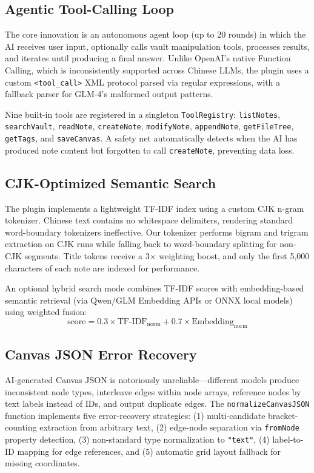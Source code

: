 \documentclass[10pt,a4paper]{article}
\begin{document}
\subsection{Agentic Tool-Calling Loop}

The core innovation is an autonomous agent loop (up to 20 rounds) in which the AI receives user input, optionally calls vault manipulation tools, processes results, and iterates until producing a final answer. Unlike OpenAI's native Function Calling, which is inconsistently supported across Chinese LLMs, the plugin uses a custom \texttt{<tool\_call>} XML protocol parsed via regular expressions, with a fallback parser for GLM-4's malformed output patterns.

Nine built-in tools are registered in a singleton \texttt{ToolRegistry}: \texttt{listNotes}, \texttt{searchVault}, \texttt{readNote}, \texttt{createNote}, \texttt{modifyNote}, \texttt{appendNote}, \texttt{getFileTree}, \texttt{getTags}, and \texttt{saveCanvas}. A safety net automatically detects when the AI has produced note content but forgotten to call \texttt{createNote}, preventing data loss.

\subsection{CJK-Optimized Semantic Search}

The plugin implements a lightweight TF-IDF index using a custom CJK n-gram tokenizer. Chinese text contains no whitespace delimiters, rendering standard word-boundary tokenizers ineffective. Our tokenizer performs bigram and trigram extraction on CJK runs while falling back to word-boundary splitting for non-CJK segments. Title tokens receive a 3$\times$ weighting boost, and only the first 5,000 characters of each note are indexed for performance.

An optional hybrid search mode combines TF-IDF scores with embedding-based semantic retrieval (via Qwen/GLM Embedding APIs or ONNX local models) using weighted fusion:
\begin{equation}
\text{score} = 0.3 \times \text{TF-IDF}_{\text{norm}} + 0.7 \times \text{Embedding}_{\text{norm}}
\end{equation}

\subsection{Canvas JSON Error Recovery}

AI-generated Canvas JSON is notoriously unreliable---different models produce inconsistent node types, interleave edges within node arrays, reference nodes by text labels instead of IDs, and output duplicate edges. The \texttt{normalizeCanvasJSON} function implements five error-recovery strategies: (1) multi-candidate bracket-counting extraction from arbitrary text, (2) edge-node separation via \texttt{fromNode} property detection, (3) non-standard type normalization to \texttt{"text"}, (4) label-to-ID mapping for edge references, and (5) automatic grid layout fallback for missing coordinates.
\end{document}
